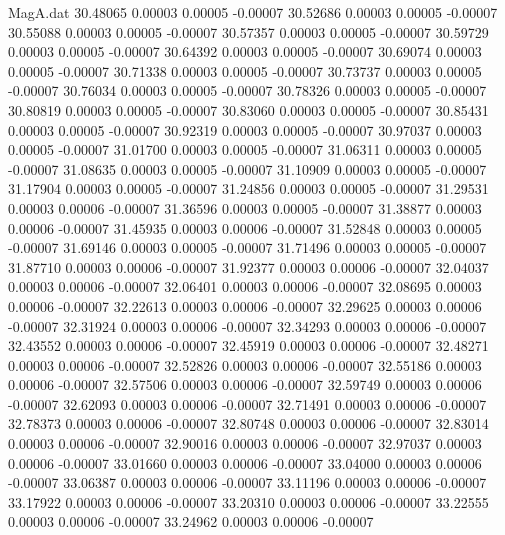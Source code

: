 \begin{filecontents}{MagA.dat}
  30.48065    0.00003    0.00005   -0.00007
  30.52686    0.00003    0.00005   -0.00007
  30.55088    0.00003    0.00005   -0.00007
  30.57357    0.00003    0.00005   -0.00007
  30.59729    0.00003    0.00005   -0.00007
  30.64392    0.00003    0.00005   -0.00007
  30.69074    0.00003    0.00005   -0.00007
  30.71338    0.00003    0.00005   -0.00007
  30.73737    0.00003    0.00005   -0.00007
  30.76034    0.00003    0.00005   -0.00007
  30.78326    0.00003    0.00005   -0.00007
  30.80819    0.00003    0.00005   -0.00007
  30.83060    0.00003    0.00005   -0.00007
  30.85431    0.00003    0.00005   -0.00007
  30.92319    0.00003    0.00005   -0.00007
  30.97037    0.00003    0.00005   -0.00007
  31.01700    0.00003    0.00005   -0.00007
  31.06311    0.00003    0.00005   -0.00007
  31.08635    0.00003    0.00005   -0.00007
  31.10909    0.00003    0.00005   -0.00007
  31.17904    0.00003    0.00005   -0.00007
  31.24856    0.00003    0.00005   -0.00007
  31.29531    0.00003    0.00006   -0.00007
  31.36596    0.00003    0.00005   -0.00007
  31.38877    0.00003    0.00006   -0.00007
  31.45935    0.00003    0.00006   -0.00007
  31.52848    0.00003    0.00005   -0.00007
  31.69146    0.00003    0.00005   -0.00007
  31.71496    0.00003    0.00005   -0.00007
  31.87710    0.00003    0.00006   -0.00007
  31.92377    0.00003    0.00006   -0.00007
  32.04037    0.00003    0.00006   -0.00007
  32.06401    0.00003    0.00006   -0.00007
  32.08695    0.00003    0.00006   -0.00007
  32.22613    0.00003    0.00006   -0.00007
  32.29625    0.00003    0.00006   -0.00007
  32.31924    0.00003    0.00006   -0.00007
  32.34293    0.00003    0.00006   -0.00007
  32.43552    0.00003    0.00006   -0.00007
  32.45919    0.00003    0.00006   -0.00007
  32.48271    0.00003    0.00006   -0.00007
  32.52826    0.00003    0.00006   -0.00007
  32.55186    0.00003    0.00006   -0.00007
  32.57506    0.00003    0.00006   -0.00007
  32.59749    0.00003    0.00006   -0.00007
  32.62093    0.00003    0.00006   -0.00007
  32.71491    0.00003    0.00006   -0.00007
  32.78373    0.00003    0.00006   -0.00007
  32.80748    0.00003    0.00006   -0.00007
  32.83014    0.00003    0.00006   -0.00007
  32.90016    0.00003    0.00006   -0.00007
  32.97037    0.00003    0.00006   -0.00007
  33.01660    0.00003    0.00006   -0.00007
  33.04000    0.00003    0.00006   -0.00007
  33.06387    0.00003    0.00006   -0.00007
  33.11196    0.00003    0.00006   -0.00007
  33.17922    0.00003    0.00006   -0.00007
  33.20310    0.00003    0.00006   -0.00007
  33.22555    0.00003    0.00006   -0.00007
  33.24962    0.00003    0.00006   -0.00007

\end{filecontents}

